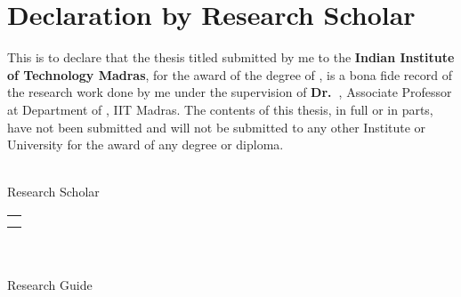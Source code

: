 \xclearpage%
\setcounter{page}{1}

\section*{Declaration by Research Scholar}

\vspace*{0.5in}  

\noindent 
This is to declare that the thesis titled {\bf
  \mythesistitleNOTSYNPOSIS} submitted by me to the {\bf Indian
  Institute of Technology Madras}, for the award of the degree of {\bf
  \mydegree}, is a bona fide record of the research work done by me
under the supervision of {\bf Dr.~\myadvisor}, Associate Professor at
Department of \mydept, IIT Madras.  The contents of this thesis, in
full or in parts, have not been submitted and will not be submitted to
any other Institute or University for the award of any degree or
diploma.

\vspace*{1.5in}

\begin{singlespacing}
  \hspace*{-0.25in}
  \parbox{3in}{
     \\
    \small
    \noindent Research Scholar} \hfill
  \parbox{1.25in}{               %
    \small
    \vspace*{0.75in}
    \begin{tabular}[h]{r}
    \noindent {Chennai}\\         
    \noindent {\mythesissubmissiondate} 
    \end{tabular}
  }
\end{singlespacing}



\vspace*{1.5in}

\begin{singlespacing}
  \hspace*{-0.25in}
  \parbox{3in}{
    \\
     \\
    \small
    \noindent Research Guide} 
\end{singlespacing}

